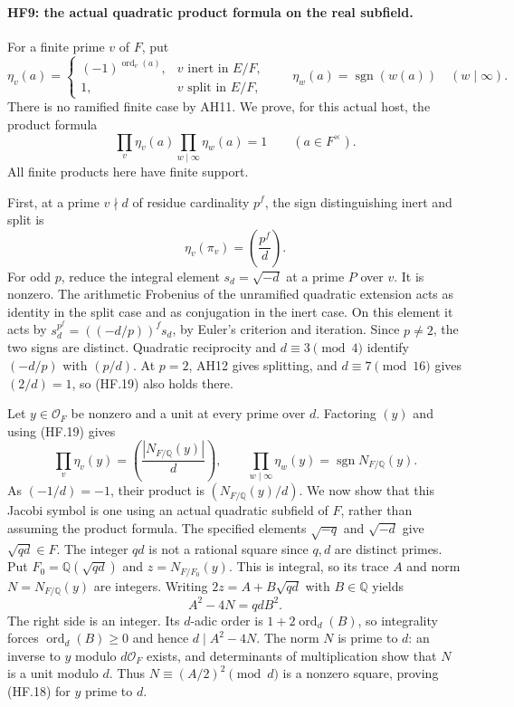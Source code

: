 \paragraph{HF9: the actual quadratic product formula on the real subfield.}
For a finite prime $v$ of $F$, put
\[
 \eta_v(a)=
 \begin{cases}
     (-1)^{\operatorname{ord}_v(a)},&v\text{ inert in }E/F,\\
     1,&v\text{ split in }E/F,
 \end{cases}
 \qquad
 \eta_w(a)=\operatorname{sgn}(w(a))\quad(w\mid\infty).
 \tag{HF.17}
\]
There is no ramified finite case by AH11. We prove, for this
actual host, the product formula
\[
             \prod_v\eta_v(a)\prod_{w\mid\infty}\eta_w(a)=1
                         \qquad(a\in F^\times).        \tag{HF.18}
\]
All finite products here have finite support.

First, at a prime $v\nmid d$ of residue cardinality $p^f$,
the sign distinguishing inert and split is
\[
             \eta_v(\pi_v)=\left(\frac{p^f}{d}\right).
 \tag{HF.19}
\]
For odd $p$, reduce the integral element $s_d=\sqrt{-d}$
at a prime $P$ over $v$. It is nonzero. The arithmetic
Frobenius of the unramified quadratic extension acts as
identity in the split case and as conjugation in the inert
case. On this element it acts by
$s_d^{p^f}=((-d/p))^f s_d$, by Euler's criterion and
iteration. Since $p\ne2$, the two signs are distinct.
Quadratic reciprocity and $d\equiv3\pmod4$ identify
$(-d/p)$ with $(p/d)$. At $p=2$, AH12 gives splitting,
and $d\equiv7\pmod{16}$ gives $(2/d)=1$, so (HF.19)
also holds there.

Let $y\in\mathcal O_F$ be nonzero and a unit at every
prime over $d$. Factoring $(y)$ and using (HF.19) gives
\[
 \prod_v\eta_v(y)=
       \left(\frac{|N_{F/\mathbb Q}(y)|}{d}\right),\qquad
 \prod_{w\mid\infty}\eta_w(y)
                    =\operatorname{sgn}N_{F/\mathbb Q}(y).
 \tag{HF.20}
\]
As $(-1/d)=-1$, their product is
$(N_{F/\mathbb Q}(y)/d)$.
We now show that this Jacobi symbol is one using an actual
quadratic subfield of $F$, rather than assuming the product
formula. The specified elements $\sqrt{-q}$ and $\sqrt{-d}$
give $\sqrt{qd}\in F$. The integer $qd$ is not a rational
square since $q,d$ are distinct primes. Put
$F_0=\mathbb Q(\sqrt{qd})$ and
$z=N_{F/F_0}(y)$. This is integral, so its trace $A$ and norm
$N=N_{F/\mathbb Q}(y)$ are integers. Writing
$2z=A+B\sqrt{qd}$ with $B\in\mathbb Q$ yields
\[
                       A^2-4N=qdB^2.                 \tag{HF.21}
\]
The right side is an integer. Its $d$-adic order is
$1+2\operatorname{ord}_d(B)$, so integrality forces
$\operatorname{ord}_d(B)\ge0$ and hence $d\mid A^2-4N$.
The norm $N$ is prime to $d$: an inverse to $y$ modulo
$d\mathcal O_F$ exists, and determinants of multiplication
show that $N$ is a unit modulo $d$. Thus
$N\equiv(A/2)^2\pmod d$ is a nonzero square, proving
(HF.18) for $y$ prime to $d$.

